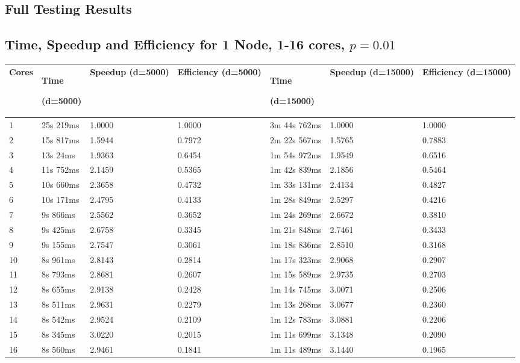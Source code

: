\documentclass[12pt]{article}
\begin{document}
\clearpage


\begin{appendices}

\clearpage
\section{Full Testing Results}
\vspace{-0.5cm}\subsection{Time, Speedup and Efficiency for 1 Node, 1-16 cores, $p=0.01$}\vspace{-0.5cm}
\footnotesize{\label{sec:oneNode}
\begin{center}
\begin{tabular}{|p{1cm}|p{2.5cm}|p{2cm}|p{2cm}|p{2.5cm}|p{2cm}|p{2cm}|}
\hline
Cores	& Time\par(d=5000)	& Speedup (d=5000)	& Efficiency (d=5000)	& Time \par(d=15000)	& Speedup (d=15000)	& Efficiency (d=15000)  \\
\hline
1	& 25s 219ms	& 1.0000	& 1.0000	& 3m 44s 762ms	& 1.0000	& 1.0000 \\
2	& 15s 817ms	& 1.5944	& 0.7972	& 2m 22s 567ms	& 1.5765	& 0.7883 \\
3	& 13s 24ms	& 1.9363	& 0.6454	& 1m 54s 972ms	& 1.9549	& 0.6516 \\
4	& 11s 752ms	& 2.1459	& 0.5365	& 1m 42s 839ms	& 2.1856	& 0.5464 \\
5	& 10s 660ms	& 2.3658	& 0.4732	& 1m 33s 131ms	& 2.4134	& 0.4827 \\
6	& 10s 171ms	& 2.4795	& 0.4133	& 1m 28s 849ms	& 2.5297	& 0.4216 \\
7	& 9s 866ms	& 2.5562	& 0.3652	& 1m 24s 269ms	& 2.6672	& 0.3810 \\
8	& 9s 425ms	& 2.6758	& 0.3345	& 1m 21s 848ms	& 2.7461	& 0.3433 \\
9	& 9s 155ms	& 2.7547	& 0.3061	& 1m 18s 836ms	& 2.8510	& 0.3168 \\
10	& 8s 961ms	& 2.8143	& 0.2814	& 1m 17s 323ms	& 2.9068	& 0.2907 \\
11	& 8s 793ms	& 2.8681	& 0.2607	& 1m 15s 589ms	& 2.9735	& 0.2703 \\
12	& 8s 655ms	& 2.9138	& 0.2428	& 1m 14s 745ms	& 3.0071	& 0.2506 \\
13	& 8s 511ms	& 2.9631	& 0.2279	& 1m 13s 268ms	& 3.0677	& 0.2360 \\
14	& 8s 542ms	& 2.9524	& 0.2109	& 1m 12s 783ms	& 3.0881	& 0.2206 \\
15	& 8s 345ms	& 3.0220	& 0.2015	& 1m 11s 699ms	& 3.1348	& 0.2090 \\
16	& 8s 560ms	& 2.9461	& 0.1841	& 1m 11s 489ms	& 3.1440	& 0.1965 \\
\hline
\end{tabular}
\end{center}}


\end{appendices}
\end{document}
